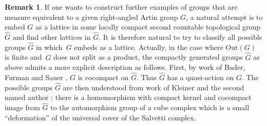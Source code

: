 \documentclass[11pt]{article}
\numberwithin{equation}{section}
\theoremstyle{plain}
\theoremstyle{definition}
\newtheorem{rk}[theo]{Remark}
\newcommand{\Out}{\mathrm{Out}}
\begin{document}
\begin{rk}
If one wants to construct further examples of groups that are measure equivalent to a given right-angled Artin group $G$, a natural attempt is to embed $G$ as a lattice in some locally compact second countable topological group $\hat{G}$ and find other lattices in $\hat{G}$. It is therefore natural to try to classify all possible groups $\hat{G}$ in which~$G$ embeds as a lattice. Actually, in the case where $\Out(G)$ is finite and~$G$ does not split as a product, the compactly generated groups $\hat G$ as above admits a more explicit description as follows. First, by work of Bader, Furman and Sauer \hbox{\cite[Th.\,1.4 \& Th.\,A]{bader2020lattice}}, $G$ is cocompact on $\hat G$. Thus $\hat G$ has a quasi-action on $G$. The possible groups $\hat{G}$ are then understood from work of Kleiner and the second named author \cite{KH}: there is a homomorphism with compact kernel and cocompact image from $\hat{G}$ to the automorphism group of a cube complex which is a small ``deformation'' of the universal cover of the Salvetti complex.
\end{rk}

\end{document}
